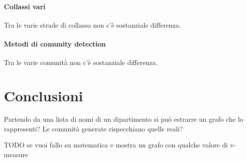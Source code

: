 \documentclass[12pt,a4paper,twoside]{report}
\begin{document}
\subsubsection{Collassi vari}\label{ssc:analisicollassi}
Tra le varie strade di collasso non c'è sostanziale differenza.
\subsubsection{Metodi di comunity detection}\label{ssc:analisicd}
Tra le varie comunità non c'è sostanziale differenza.



\whitePage
\chapter{Conclusioni} \label{cap:conclusioni}
Partendo da una lista di nomi di un dipartimento si può estrarre un grafo che lo rappresenti? Le comunità generate rispecchiano quelle reali?

TODO se vuoi fallo su matematica e mostra un grafo con qualche valore di v-measure






\end{document}
